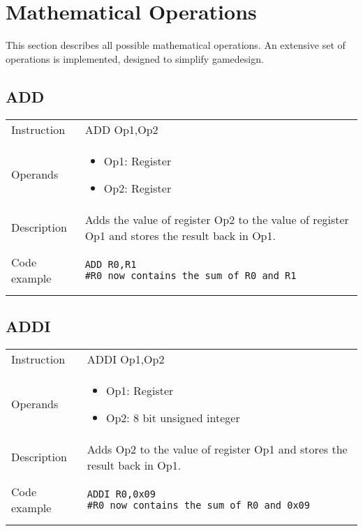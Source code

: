 \newpage

\section{Mathematical Operations}
This section describes all possible mathematical operations. An extensive set of operations is implemented, designed to simplify gamedesign.

\subsection{ADD}
\renewcommand*{\arraystretch}{2.0}
\begin{longtable}{P{3cm}P{9cm}}
\midrule
\noindent Instruction & ADD Op1,Op2 \\
\noindent Operands &
\begin{itemize}[label={},noitemsep,leftmargin=*,topsep=0pt,partopsep=0pt, itemsep=1em]
\item Op1: Register
\item Op2: Register
\end{itemize}\\
\noindent Description & Adds the value of register Op2 to the value of register Op1 and stores the result back in Op1.
	 \\
\noindent Code example & 
\begin{lstlisting}
ADD R0,R1
#R0 now contains the sum of R0 and R1
\end{lstlisting} \\
\end{longtable}


\subsection{ADDI}
\renewcommand*{\arraystretch}{2.0}
\begin{longtable}{P{3cm}P{9cm}}
\midrule
\noindent Instruction & ADDI Op1,Op2 \\
\noindent Operands &
\begin{itemize}[label={},noitemsep,leftmargin=*,topsep=0pt,partopsep=0pt, itemsep=1em]
\item Op1: Register
\item Op2: 8 bit unsigned integer
\end{itemize}\\
\noindent Description & Adds Op2 to the value of register Op1 and stores the result back in Op1.
	 \\
\noindent Code example & 
\begin{lstlisting}
ADDI R0,0x09
#R0 now contains the sum of R0 and 0x09
\end{lstlisting} \\
\end{longtable}

